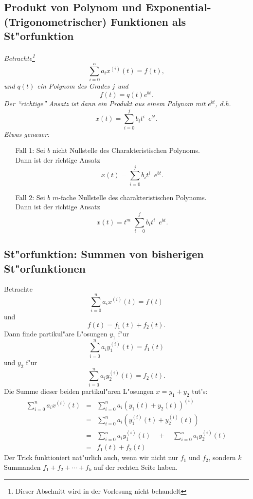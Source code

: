\begin{auf}\cha\label{block4A3}

\end{auf}
\subsection{Produkt von Polynom und Exponential- (Trigonometrischer)  Funktionen als St"orfunktion}
{\it Betrachte\footnote{Dieser Abschnitt wird in der Vorlesung nicht behandelt}
$$ \sum_{i=0}^n a_i x^{(i)}(t) = f(t),$$
und $q(t)$ ein Polynom des Grades $j$ und
$$f(t) = q(t) e^{bt}.$$
Der ``richtige'' Ansatz ist dann ein Produkt aus einem Polynom mit $e^{bt}$, d.h.
$$ x(t) = \sum_{i=0}^j b_i t^i\,\,\, e^{bt}.$$
Etwas genauer: 
\begin{itemize}
\item[Fall 1:] Sei $b$ nicht Nullstelle des Charakteristischen Polynoms.\\
Dann ist der richtige Ansatz
$$ x(t) = \sum_{i=0}^{j} b_i t^i\,\,\, e^{bt}.$$
\item[Fall 2:] Sei $b$ $m$-fache Nullstelle des charakteristischen Polynoms.\\
Dann ist der richtige Ansatz
$$ x(t) = t^m\,\,\sum_{i=0}^{j} b_i t^i\,\,\, e^{bt}.$$ 
\end{itemize}}
\subsection{St"orfunktion: Summen von bisherigen St"orfunktionen}
 Betrachte  
$$ \sum_{i=0}^n a_i x^{(i)}(t) = f(t)$$
und
$$ f(t) = f_1(t) + f_2(t).$$
Dann finde partikul"are L"osungen $y_1$ f"ur
$$ \sum_{i=0}^n a_i y_1^{(i)}(t) = f_1(t)$$
und $y_2$ f"ur 
$$ \sum_{i=0}^n a_i y_2^{(i)}(t) = f_2(t).$$
Die Summe dieser beiden partikul"aren L"osungen $x=y_1+y_2$ tut's:
\begin{eqnarray*}
\sum_{i=0}^n a_i x^{(i)}(t)
 & = & 
\sum_{i=0}^n a_i (y_1(t)+y_2(t))^{(i)}\\
 & = & 
\sum_{i=0}^n a_i (y_1^{(i)}(t)+y_2^{(i)}(t))\\
 & = &  
 \sum_{i=0}^n a_i y_1^{(i)}(t) \quad + \quad
 \sum_{i=0}^n a_i y_2^{(i)}(t)\\
  & = & 
  f_1(t)+f_2(t)
\end{eqnarray*}
Der Trick funktioniert nat"urlich auch, wenn wir nicht nur $f_1$ und $f_2$, 
sondern $k$ Summanden $f_1+f_2+\cdots+f_k$ auf der rechten Seite haben.
